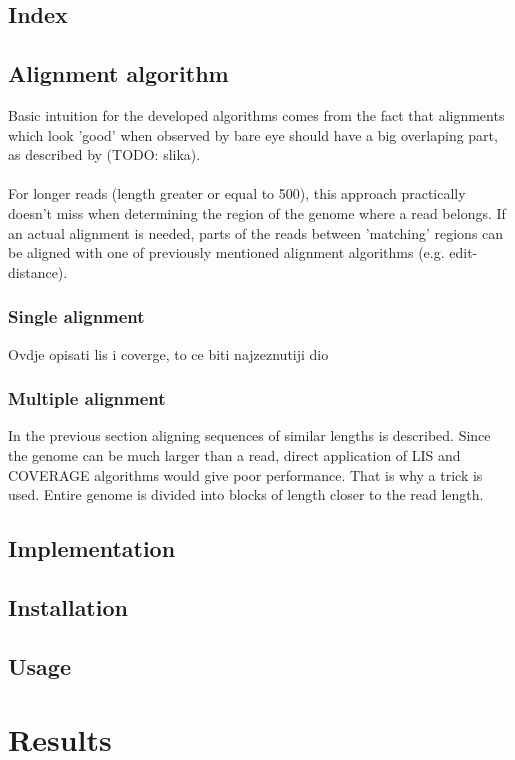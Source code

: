 \documentclass[times, utf8, diplomski]{fer}
\begin{document}
\section{Index}
\section{Alignment algorithm}
Basic intuition for the developed algorithms comes from the fact that alignments which look 'good' when observed by bare eye should have a big overlaping part, as described by (TODO: slika).\\
\\
For longer reads (length greater or equal to 500), this approach practically doesn't miss when determining the region of the genome where a read belongs. If an actual alignment is needed, parts of the reads between 'matching' regions can be aligned with one of previously mentioned alignment algorithms (e.g. edit-distance).

\subsection{Single alignment}
Ovdje opisati lis i coverge, to ce biti najzeznutiji dio
\subsection{Multiple alignment}
In the previous section aligning sequences of similar lengths is described. Since the genome can be much larger than a read, direct application of LIS and COVERAGE algorithms would give poor performance. That is why a trick is used. Entire genome is divided into blocks of length closer to the read length.
\section{Implementation}
\section{Installation}
\section{Usage}

\chapter{Results}
\end{document}
